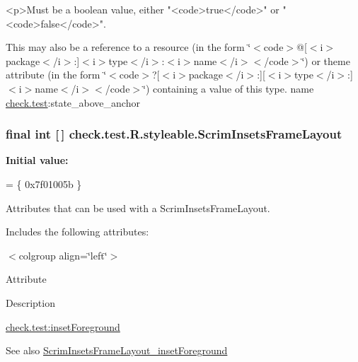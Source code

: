 \begin{DoxyVerb}      <p>Must be a boolean value, either "<code>true</code>" or "<code>false</code>".
\end{DoxyVerb}
 

This may also be a reference to a resource (in the form \char`\"{}$<$code$>$@\mbox{[}$<$i$>$package$<$/i$>$\+:\mbox{]}$<$i$>$type$<$/i$>$\+:$<$i$>$name$<$/i$>$$<$/code$>$\char`\"{}) or theme attribute (in the form \char`\"{}$<$code$>$?\mbox{[}$<$i$>$package$<$/i$>$\+:\mbox{]}\mbox{[}$<$i$>$type$<$/i$>$\+:\mbox{]}$<$i$>$name$<$/i$>$$<$/code$>$\char`\"{}) containing a value of this type.  name \hyperlink{namespacecheck_1_1test}{check.\+test}\+:state\+\_\+above\+\_\+anchor \hypertarget{classcheck_1_1test_1_1_r_1_1styleable_a864e4953b765cf2c4b15edebf1565653}{}
\subsubsection[{Scrim\+Insets\+Frame\+Layout}]{\setlength{\rightskip}{0pt plus 5cm}final int \mbox{[}$\,$\mbox{]} check.\+test.\+R.\+styleable.\+Scrim\+Insets\+Frame\+Layout\hspace{0.3cm}{\ttfamily [static]}}\label{classcheck_1_1test_1_1_r_1_1styleable_a864e4953b765cf2c4b15edebf1565653}
{\bfseries Initial value\+:}
\begin{DoxyCode}
= \{
            0x7f01005b
        \}
\end{DoxyCode}
Attributes that can be used with a Scrim\+Insets\+Frame\+Layout. 

Includes the following attributes\+:

\begin{TabularC}{0}
\hline
\end{TabularC}
$<$colgroup align=\char`\"{}left\char`\"{}$>$ 

Attribute

Description 

{\ttfamily \hyperlink{classcheck_1_1test_1_1_r_1_1styleable_a077f41ccea85d0536aa50008070c632e}{check.\+test\+:inset\+Foreground}}

\begin{DoxySeeAlso}{See also}
\hyperlink{classcheck_1_1test_1_1_r_1_1styleable_a077f41ccea85d0536aa50008070c632e}{Scrim\+Insets\+Frame\+Layout\+\_\+inset\+Foreground} 
\end{DoxySeeAlso}
\hypertarget{classcheck_1_1test_1_1_r_1_1styleable_a077f41ccea85d0536aa50008070c632e}{}
